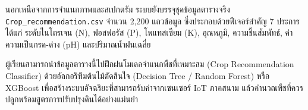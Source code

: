 \label{sec:crop_recommendation}

นอกเหนือจากการจำแนกภาพและสเปกตรัม ระบบยังบรรจุชุดข้อมูลตารางจริง \texttt{Crop\_\allowbreak recommendation.csv} จำนวน 2,200 แถวข้อมูล ซึ่งประกอบด้วยฟีเจอร์สำคัญ 7 ประการ ได้แก่ ระดับไนโตรเจน (N), ฟอสฟอรัส (P), โพแทสเซียม (K), อุณหภูมิ, ความชื้นสัมพัทธ์, ค่าความเป็นกรด-ด่าง (pH) และปริมาณน้ำฝนเฉลี่ย

ผู้เรียนสามารถนำข้อมูลตารางนี้ไปฝึกฝนโมเดลจำแนกพืชที่เหมาะสม (Crop Recommendation Classifier) ด้วยอัลกอริทึมต้นไม้ตัดสินใจ (Decision Tree / Random Forest) หรือ XGBoost เพื่อสร้างระบบอัจฉริยะที่สามารถรับค่าจากเซนเซอร์ IoT ภาคสนาม แล้วคำนวณพืชที่ควรปลูกพร้อมสูตรการปรับปรุงดินได้อย่างแม่นยำ

